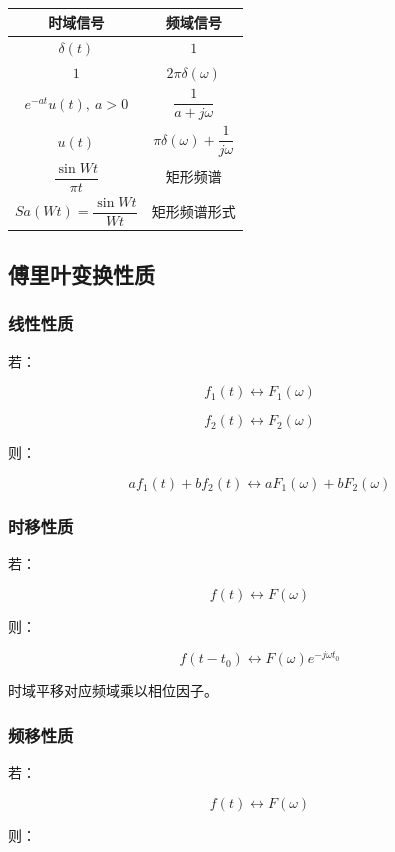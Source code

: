 \documentclass[UTF8]{ctexart}
\begin{document}
\begin{table}[h]
\centering
\begin{tabular}{c c}
\toprule
时域信号 & 频域信号 \\
\midrule
$\delta(t)$ & $1$ \\
$1$ & $2\pi\delta(\omega)$ \\
$e^{-at}u(t),\ a>0$ & $\dfrac{1}{a+j\omega}$ \\
$u(t)$ & $\pi\delta(\omega)+\dfrac{1}{j\omega}$ \\
$\dfrac{\sin Wt}{\pi t}$ & 矩形频谱 \\
$Sa(Wt)=\dfrac{\sin Wt}{Wt}$ & 矩形频谱形式 \\
\bottomrule
\end{tabular}
\end{table}

\subsection{傅里叶变换性质}

\subsubsection{线性性质}

若：

\[
f_1(t)\leftrightarrow F_1(\omega)
\]

\[
f_2(t)\leftrightarrow F_2(\omega)
\]

则：

\[
af_1(t)+bf_2(t)\leftrightarrow aF_1(\omega)+bF_2(\omega)
\]

\subsubsection{时移性质}

若：

\[
f(t)\leftrightarrow F(\omega)
\]

则：

\[
f(t-t_0)\leftrightarrow F(\omega)e^{-j\omega t_0}
\]

时域平移对应频域乘以相位因子。

\subsubsection{频移性质}

若：

\[
f(t)\leftrightarrow F(\omega)
\]

则：
\end{document}
